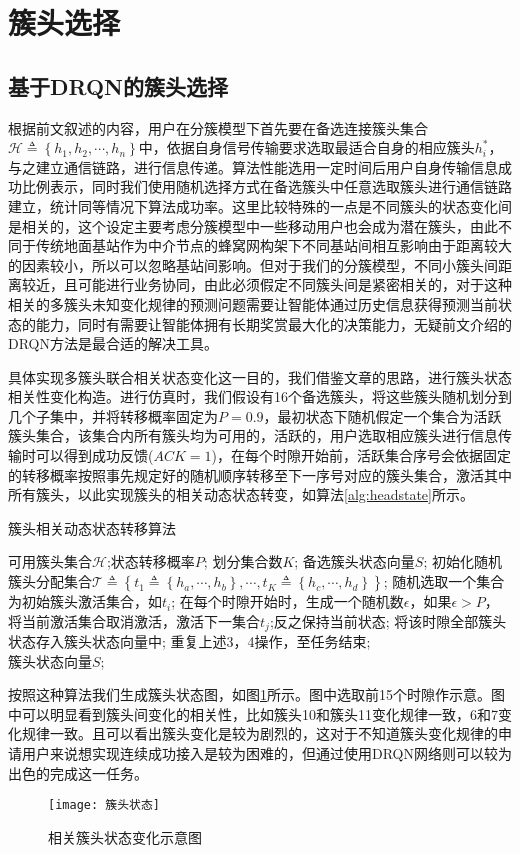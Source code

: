 \section{簇头选择}
\subsection{基于DRQN的簇头选择}
根据前文叙述的内容，用户在分簇模型下首先要在备选连接簇头集合$\mathcal{H} \triangleq \left \{ h_{1} ,h_{2},\cdots,h_{n}\right \}$中，依据自身信号传输要求选取最适合自身的相应簇头$h_{i}^{*}$，与之建立通信链路，进行信息传递。算法性能选用一定时间后用户自身传输信息成功比例表示，同时我们使用随机选择方式在备选簇头中任意选取簇头进行通信链路建立，统计同等情况下算法成功率。这里比较特殊的一点是不同簇头的状态变化间是相关的，这个设定主要考虑分簇模型中一些移动用户也会成为潜在簇头，由此不同于传统地面基站作为中介节点的蜂窝网构架下不同基站间相互影响由于距离较大的因素较小，所以可以忽略基站间影响。但对于我们的分簇模型，不同小簇头间距离较近，且可能进行业务协同，由此必须假定不同簇头间是紧密相关的，对于这种相关的多簇头未知变化规律的预测问题需要让智能体通过历史信息获得预测当前状态的能力，同时有需要让智能体拥有长期奖赏最大化的决策能力，无疑前文介绍的DRQN方法是最合适的解决工具。

具体实现多簇头联合相关状态变化这一目的，我们借鉴文章\cite{8303773}的思路，进行簇头状态相关性变化构造。进行仿真时，我们假设有16个备选簇头，将这些簇头随机划分到几个子集中，并将转移概率固定为$P=0.9$，最初状态下随机假定一个集合为活跃簇头集合，该集合内所有簇头均为可用的，活跃的，用户选取相应簇头进行信息传输时可以得到成功反馈($ACK=1$)，在每个时隙开始前，活跃集合序号会依据固定的转移概率按照事先规定好的随机顺序转移至下一序号对应的簇头集合，激活其中所有簇头，以此实现簇头的相关动态状态转变，如算法\ref{alg:headstate}所示。
\begin{algorithm}[htb]  
	\caption{簇头相关动态状态转移算法}  
	\label{alg:headstate}  
	\begin{algorithmic}[1]  
		\Require  
		 可用簇头集合$\mathcal{H}$;状态转移概率$P$; 划分集合数$K$; 
		\Ensure  
		 备选簇头状态向量$S$;  
		\State 初始化随机簇头分配集合$\mathcal{T}\triangleq\left \{ t_{1}\triangleq\left \{h_{a},\cdots,h_{b}\right \} ,\cdots,t_{K}\triangleq\left \{h_{c},\cdots,h_{d}\right \}\right \}$;
		\State 随机选取一个集合为初始簇头激活集合，如$t_{i}$;				
		\State 在每个时隙开始时，生成一个随机数$\epsilon$，如果$\epsilon>P$，将当前激活集合取消激活，激活下一集合$t_{j}$;反之保持当前状态;  
		\State 将该时隙全部簇头状态存入簇头状态向量中;
		\State 重复上述3，4操作，至任务结束; \\
		\Return 簇头状态向量$S$;  
	\end{algorithmic}  
\end{algorithm}  
按照这种算法我们生成簇头状态图，如图\ref{fig:簇头状态}所示。图中选取前15个时隙作示意。图中可以明显看到簇头间变化的相关性，比如簇头10和簇头11变化规律一致，6和7变化规律一致。且可以看出簇头变化是较为剧烈的，这对于不知道簇头变化规律的申请用户来说想实现连续成功接入是较为困难的，但通过使用DRQN网络则可以较为出色的完成这一任务。
\begin{figure}[htbp]
	\centering
	\texttt{[image: 簇头状态]}
	\caption{相关簇头状态变化示意图}
	\label{fig:簇头状态}
\end{figure}


